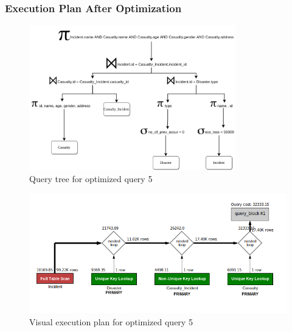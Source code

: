 \subsubsection{Execution Plan After Optimization}
\begin{figure}[H]
    \centering
    \includegraphics[width=0.8\textwidth]{images/query_trees/query5-optimized.png}
    \caption{Query tree for optimized query 5}
\end{figure}
\begin{figure}[H]
    \centering
    \includegraphics[width=\textwidth]{images/execution_plans/q5-4-new.png}
    \caption{Visual execution plan for optimized query 5}
\end{figure}
